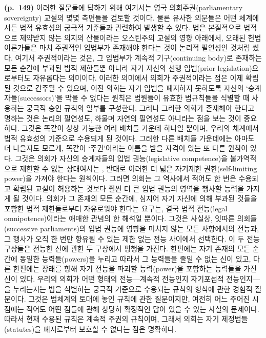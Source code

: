 \textbf{(p.~149)} 이러한 질문들에 답하기 위해 여기서는 영국
의회주권(parliamentary sovereignty) 교설의 몇몇 측면들을 검토할 것이다.
물론 유사한 의문들은 어떤 체계에서든 법적 유효성의 궁극적 기준들과
관련하여 발생할 수 있다. 법은 본질적으로 법적으로 제약받지 않는 의지의
산물이라는 오스틴주의 교설의 영향 아래에서, 오래된 헌법이론가들은 마치
주권적인 입법부가 존재해야 한다는 것이 논리적 필연성인 것처럼 썼다.
여기서 주권적이라는 것은, 그 입법부가 계속적 기구(continuing body)로
존재하는 모든 순간에  부과된 법적 제한들뿐
아니라 자기 자신의 선행 입법(prior legislation)으로부터도 자유롭다는
의미이다. 이러한 의미에서 의회가 주권적이라는 점은 이제 확립된 것으로
간주될 수 있으며, 이전 의회는 자기 입법을 폐지하지 못하도록 자신의
‘승계자들(successors)’을 막을 수 없다는 원칙은 법원들이 유효한
법규칙들을 식별할 때 사용하는 궁극적 승인 규칙의 일부를 구성한다. 그러나
그러한 의회가 존재해야 한다고 명하는 것은 논리의 필연성도, 하물며 자연의
필연성도 아니라는 점을 보는 것이 중요하다. 그것은 똑같이 상상 가능한
여러 배치들 가운데 하나일 뿐이며, 우리의 체계에서 법적 유효성의 기준으로
수용되게 된 것이다. 그러한 다른 배치들 가운데에는 아마도 더 나을지도
모르게, 똑같이 ‘주권’이라는 이름을 받을 자격이 있는 또 다른 원칙이 있다.
그것은 의회가 자신의 승계자들의 입법 권능(legislative competence)을
불가역적으로 제한할 수 없는 상태여서는 , 반대로
이러한 더 넓은 자기제한 권한(self-limiting power)을 가져야 한다는
원칙이다. 그러면 의회는 그 역사에서 적어도 한 번은 수용되고 확립된
교설이 허용하는 것보다 훨씬 더 큰 입법 권능의 영역을 행사할 능력을
가지게 될 것이다. 의회가 그 존재의 모든 순간에, 심지어 자기 자신에 의해
부과된 것들을 포함한 법적 제한들로부터 자유로워야 한다는 요구는, 결국
법적 전능(legal omnipotence)이라는 애매한 관념의 한 해석일 뿐이다.
그것은 사실상, 잇따른 의회들(successive parliaments)의 입법 권능에
영향을 미치지 않는 모든 사항에서의  전능과, 그
행사가 오직 한 번만 향유될 수 있는 제한 없는
 전능 사이에서 선택한다. 이 두 전능
구상들은 전능한 신에 관한 두 구상에서 평행을 가진다. 한편에는 자기
존재의 모든 순간에 동일한 능력들(powers)을 누리고 따라서 그 능력들을
줄일 수 없는 신이 있고, 다른 한편에는 장래를 향해 자기 전능을 파괴할
능력(power)을 포함하는 능력들을 가진 신이 있다. 우리의 의회가 어떤
형태의 전능---계속적 전능인지 자기포섭적 전능인지---을 누리는지는 법을
식별하는 궁극적 기준으로 수용되는 규칙의 형식에 관한 경험적 질문이다.
그것은 법체계의 토대에 놓인 규칙에 관한 질문이지만, 여전히 어느 주어진
시점에는 적어도 어떤 점들에 관해 상당히 확정적인 답이 있을 수 있는
사실의 문제이다. 따라서 현재 수용된 규칙은 계속적 주권의 규칙이며,
그래서 의회는 자기 제정법들(statutes)을 폐지로부터 보호할 수 없다는 점은
명확하다.

